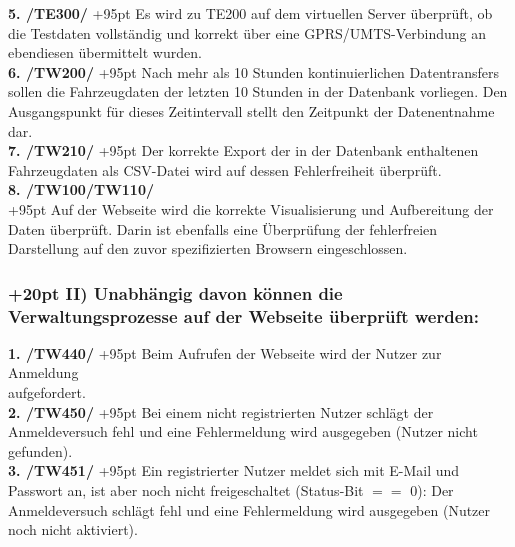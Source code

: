 \documentclass[fontsize = 12pt, paper = a4]{scrreprt}
\begin{document}
\textbf{5. /TE300/}
\hangindent+95pt 
\hspace*{7.2mm}
Es wird zu TE200 auf dem virtuellen Server überprüft, ob die Testdaten vollständig und korrekt über eine GPRS/UMTS-Verbindung an ebendiesen übermittelt wurden. \\
 
\textbf{6. /TW200/}
\hangindent+95pt 
\hspace*{5.5mm} 
Nach mehr als 10 Stunden kontinuierlichen Datentransfers sollen die Fahrzeugdaten der letzten 10 Stunden in der Datenbank vorliegen. Den Ausgangspunkt für dieses Zeitintervall stellt den Zeitpunkt der Datenentnahme dar.\\
 
\textbf{7. /TW210/}
\hangindent+95pt 
\hspace*{5.5mm} 
Der korrekte Export der in der Datenbank enthaltenen Fahrzeugdaten als CSV-Datei wird auf dessen Fehlerfreiheit überprüft.\\

\textbf{8. /TW100/TW110/}\\
\hangindent+95pt 
Auf der Webseite wird die korrekte Visualisierung und Aufbereitung der Daten überprüft. Darin ist ebenfalls eine Überprüfung der fehlerfreien Darstellung auf den zuvor spezifizierten Browsern eingeschlossen. 

\newpage

\subsubsection*{
\hangindent+20pt 
II) Unabhängig davon können die Verwaltungsprozesse auf der Webseite überprüft werden:}

\vspace*{3mm}

\textbf{1. /TW440/}
\hangindent+95pt 
\hspace*{5.5mm}
Beim Aufrufen der Webseite wird der Nutzer zur Anmeldung \\ aufgefordert.\\

\textbf{2. /TW450/}
\hangindent+95pt 
\hspace*{5.5mm}
Bei einem nicht registrierten Nutzer schlägt der Anmeldeversuch fehl und eine Fehlermeldung wird ausgegeben (Nutzer nicht gefunden).\\

\textbf{3. /TW451/}
\hangindent+95pt 
\hspace*{5.5mm}
Ein registrierter Nutzer meldet sich mit E-Mail und Passwort an, ist aber noch nicht freigeschaltet (Status-Bit $==$ 0): Der Anmeldeversuch schlägt fehl und eine Fehlermeldung wird ausgegeben (Nutzer noch nicht aktiviert).\\
 
\end{document}
